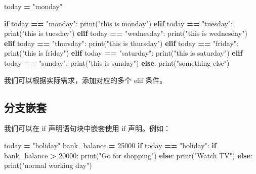 \documentclass[]{ctexbook}
\newenvironment{Shaded}{\begin{snugshade}}{\end{snugshade}}
\newcommand{\BuiltInTok}[1]{#1}
\newcommand{\ControlFlowTok}[1]{\textcolor[rgb]{0.13,0.29,0.53}{\textbf{#1}}}
\newcommand{\DecValTok}[1]{\textcolor[rgb]{0.00,0.00,0.81}{#1}}
\newcommand{\NormalTok}[1]{#1}
\newcommand{\OperatorTok}[1]{\textcolor[rgb]{0.81,0.36,0.00}{\textbf{#1}}}
\newcommand{\StringTok}[1]{\textcolor[rgb]{0.31,0.60,0.02}{#1}}
\begin{document}
\begin{Shaded}
\begin{Highlighting}[]
\NormalTok{today }\OperatorTok{=} \StringTok{"monday"}

\ControlFlowTok{if}\NormalTok{ today }\OperatorTok{==} \StringTok{"monday"}\NormalTok{:}
   \BuiltInTok{print}\NormalTok{(}\StringTok{"this is monday"}\NormalTok{)}
\ControlFlowTok{elif}\NormalTok{ today }\OperatorTok{==} \StringTok{"tuesday"}\NormalTok{:}
   \BuiltInTok{print}\NormalTok{(}\StringTok{"this is tuesday"}\NormalTok{)}
\ControlFlowTok{elif}\NormalTok{ today }\OperatorTok{==} \StringTok{"wednesday"}\NormalTok{:}
   \BuiltInTok{print}\NormalTok{(}\StringTok{"this is wednesday"}\NormalTok{)}
\ControlFlowTok{elif}\NormalTok{ today }\OperatorTok{==} \StringTok{"thursday"}\NormalTok{:}
   \BuiltInTok{print}\NormalTok{(}\StringTok{"this is thursday"}\NormalTok{)}
\ControlFlowTok{elif}\NormalTok{ today }\OperatorTok{==} \StringTok{"friday"}\NormalTok{:}
   \BuiltInTok{print}\NormalTok{(}\StringTok{"this is friday"}\NormalTok{)}
\ControlFlowTok{elif}\NormalTok{ today }\OperatorTok{==} \StringTok{"saturday"}\NormalTok{:}
   \BuiltInTok{print}\NormalTok{(}\StringTok{"this is saturday"}\NormalTok{)}
\ControlFlowTok{elif}\NormalTok{ today }\OperatorTok{==} \StringTok{"sunday"}\NormalTok{:}
   \BuiltInTok{print}\NormalTok{(}\StringTok{"this is sunday"}\NormalTok{)}
\ControlFlowTok{else}\NormalTok{:}
   \BuiltInTok{print}\NormalTok{(}\StringTok{"something else"}\NormalTok{)}
\end{Highlighting}
\end{Shaded}

我们可以根据实际需求，添加对应的多个 elif 条件。

\hypertarget{ux5206ux652fux5d4cux5957}{%
\subsection{分支嵌套}\label{ux5206ux652fux5d4cux5957}}

我们可以在 if 声明语句块中嵌套使用 if 声明。例如：

\begin{Shaded}
\begin{Highlighting}[]
\NormalTok{today }\OperatorTok{=} \StringTok{"holiday"}
\NormalTok{bank_balance }\OperatorTok{=} \DecValTok{25000}
\ControlFlowTok{if}\NormalTok{ today }\OperatorTok{==} \StringTok{"holiday"}\NormalTok{:}
    \ControlFlowTok{if}\NormalTok{ bank_balance }\OperatorTok{>} \DecValTok{20000}\NormalTok{:}
        \BuiltInTok{print}\NormalTok{(}\StringTok{"Go for shopping"}\NormalTok{)}
    \ControlFlowTok{else}\NormalTok{:}
        \BuiltInTok{print}\NormalTok{(}\StringTok{"Watch TV"}\NormalTok{)}
\ControlFlowTok{else}\NormalTok{:}
    \BuiltInTok{print}\NormalTok{(}\StringTok{"normal working day"}\NormalTok{)}
\end{Highlighting}
\end{Shaded}
\end{document}
